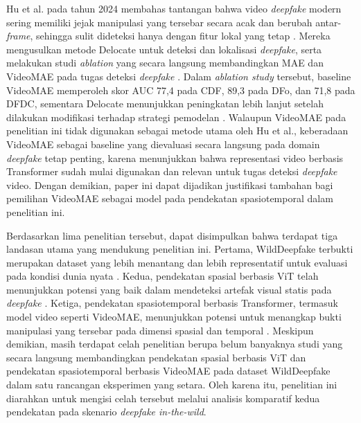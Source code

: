 Hu et al. pada tahun 2024 membahas tantangan bahwa video \textit{deepfake} modern sering memiliki jejak manipulasi yang tersebar secara acak dan berubah antar-\textit{frame}, sehingga sulit dideteksi hanya dengan fitur lokal yang tetap \cite{hu2024delocatedetectionlocalizationdeepfake}. Mereka mengusulkan metode Delocate untuk deteksi dan lokalisasi \textit{deepfake}, serta melakukan studi \textit{ablation} yang secara langsung membandingkan MAE dan VideoMAE pada tugas deteksi \textit{deepfake} \cite{hu2024delocatedetectionlocalizationdeepfake}. Dalam \textit{ablation study} tersebut, baseline VideoMAE memperoleh skor AUC 77,4 pada CDF, 89,3 pada DFo, dan 71,8 pada DFDC, sementara Delocate menunjukkan peningkatan lebih lanjut setelah dilakukan modifikasi terhadap strategi pemodelan \cite{hu2024delocatedetectionlocalizationdeepfake}. Walaupun VideoMAE pada penelitian ini tidak digunakan sebagai metode utama oleh Hu et al., keberadaan VideoMAE sebagai baseline yang dievaluasi secara langsung pada domain \textit{deepfake} tetap penting, karena menunjukkan bahwa representasi video berbasis Transformer sudah mulai digunakan dan relevan untuk tugas deteksi \textit{deepfake} video. Dengan demikian, paper ini dapat dijadikan justifikasi tambahan bagi pemilihan VideoMAE sebagai model pada pendekatan spasiotemporal dalam penelitian ini. \par

Berdasarkan lima penelitian tersebut, dapat disimpulkan bahwa terdapat tiga landasan utama yang mendukung penelitian ini. Pertama, WildDeepfake terbukti merupakan dataset yang lebih menantang dan lebih representatif untuk evaluasi pada kondisi dunia nyata \cite{Zi2024}. Kedua, pendekatan spasial berbasis ViT telah menunjukkan potensi yang baik dalam mendeteksi artefak visual statis pada \textit{deepfake} \cite{app12062953}\cite{zhuang2022uiavitunsupervisedinconsistencyawaremethod}. Ketiga, pendekatan spasiotemporal berbasis Transformer, termasuk model video seperti VideoMAE, menunjukkan potensi untuk menangkap bukti manipulasi yang tersebar pada dimensi spasial dan temporal \cite{KINGRA2024301817}\cite{hu2024delocatedetectionlocalizationdeepfake}. Meskipun demikian, masih terdapat celah penelitian berupa belum banyaknya studi yang secara langsung membandingkan pendekatan spasial berbasis ViT dan pendekatan spasiotemporal berbasis VideoMAE pada dataset WildDeepfake dalam satu rancangan eksperimen yang setara. Oleh karena itu, penelitian ini diarahkan untuk mengisi celah tersebut melalui analisis komparatif kedua pendekatan pada skenario \textit{deepfake in-the-wild}. \par

